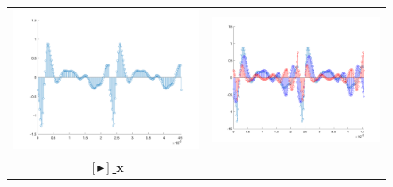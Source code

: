 \par 

\begin{figure}[h]
    \centering
    \begin{tabular}{cc}
        \includegraphics[scale=.18]{trumpetA4.png} & \includegraphics[scale=.18]{trumpetA4_LPF_HPF.png}\\
        \href{https://drive.google.com/file/d/1bsf_KsIPmAkVd0-QYObc78Y2RnRjzCUW/view?usp=sharing}{\color{blue} $[\blacktriangleright]$ $\mathbf{x}$}\\

\end{tabular}
\end{figure}
